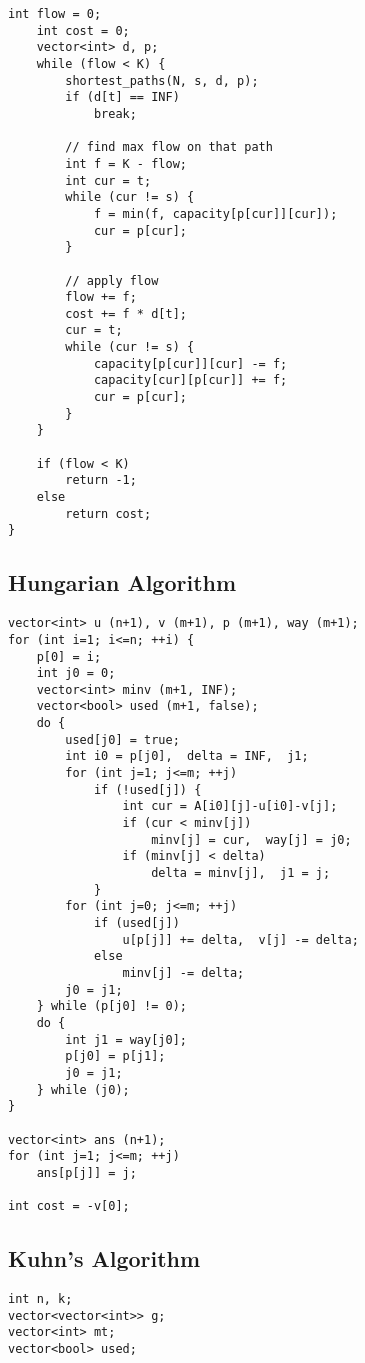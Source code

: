 \documentclass[10pt]{article}
\begin{document}
\begin{multicols*}{2}
\begin{lstlisting}[style=compactcpp]
    int flow = 0;
    int cost = 0;
    vector<int> d, p;
    while (flow < K) {
        shortest_paths(N, s, d, p);
        if (d[t] == INF)
            break;

        // find max flow on that path
        int f = K - flow;
        int cur = t;
        while (cur != s) {
            f = min(f, capacity[p[cur]][cur]);
            cur = p[cur];
        }

        // apply flow
        flow += f;
        cost += f * d[t];
        cur = t;
        while (cur != s) {
            capacity[p[cur]][cur] -= f;
            capacity[cur][p[cur]] += f;
            cur = p[cur];
        }
    }

    if (flow < K)
        return -1;
    else
        return cost;
}
\end{lstlisting}

\subsection{Hungarian Algorithm}

\begin{lstlisting}[style=compactcpp]
vector<int> u (n+1), v (m+1), p (m+1), way (m+1);
for (int i=1; i<=n; ++i) {
    p[0] = i;
    int j0 = 0;
    vector<int> minv (m+1, INF);
    vector<bool> used (m+1, false);
    do {
        used[j0] = true;
        int i0 = p[j0],  delta = INF,  j1;
        for (int j=1; j<=m; ++j)
            if (!used[j]) {
                int cur = A[i0][j]-u[i0]-v[j];
                if (cur < minv[j])
                    minv[j] = cur,  way[j] = j0;
                if (minv[j] < delta)
                    delta = minv[j],  j1 = j;
            }
        for (int j=0; j<=m; ++j)
            if (used[j])
                u[p[j]] += delta,  v[j] -= delta;
            else
                minv[j] -= delta;
        j0 = j1;
    } while (p[j0] != 0);
    do {
        int j1 = way[j0];
        p[j0] = p[j1];
        j0 = j1;
    } while (j0);
}

vector<int> ans (n+1);
for (int j=1; j<=m; ++j)
    ans[p[j]] = j;

int cost = -v[0];
\end{lstlisting}

\subsection{Kuhn's Algorithm}

\begin{lstlisting}[style=compactcpp]
int n, k;
vector<vector<int>> g;
vector<int> mt;
vector<bool> used;


\end{lstlisting}
\end{multicols*}
\end{document}
